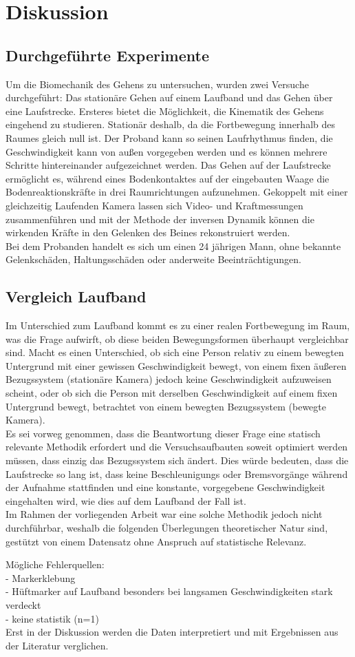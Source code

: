 \section{Diskussion}
\subsection{Durchgeführte Experimente}
Um die Biomechanik des Gehens zu untersuchen, wurden zwei Versuche durchgeführt: Das stationäre Gehen auf einem Laufband und das Gehen über eine Laufstrecke. Ersteres bietet die Möglichkeit, die Kinematik des Gehens eingehend zu studieren. Stationär deshalb, da die Fortbewegung innerhalb des Raumes gleich null ist. Der Proband kann so seinen Laufrhythmus finden, die Geschwindigkeit kann von außen vorgegeben werden und es können mehrere Schritte hintereinander aufgezeichnet werden. Das Gehen auf der Laufstrecke ermöglicht es, während eines Bodenkontaktes auf der eingebauten Waage die Bodenreaktionskräfte in drei Raumrichtungen aufzunehmen. Gekoppelt mit einer gleichzeitig Laufenden Kamera lassen sich Video- und Kraftmessungen zusammenführen und mit der Methode der inversen Dynamik können die wirkenden Kräfte in den Gelenken des Beines rekonstruiert werden. \\
Bei dem Probanden handelt es sich um einen 24 jährigen Mann, ohne bekannte Gelenkschäden, Haltungsschäden oder anderweite Beeinträchtigungen. 




\subsection{Vergleich Laufband}
Im Unterschied zum Laufband kommt es zu einer realen Fortbewegung im Raum, was die Frage aufwirft, ob diese beiden Bewegungsformen überhaupt vergleichbar sind. Macht es einen Unterschied, ob sich eine Person relativ zu einem bewegten Untergrund mit einer gewissen Geschwindigkeit bewegt, von einem fixen äußeren Bezugssystem (stationäre Kamera) jedoch keine Geschwindigkeit aufzuweisen scheint, oder ob sich die Person mit derselben Geschwindigkeit auf einem fixen Untergrund bewegt, betrachtet von einem bewegten Bezugssystem (bewegte Kamera).\\
Es sei vorweg genommen, dass die Beantwortung dieser Frage eine statisch relevante Methodik erfordert und die Versuchsaufbauten soweit optimiert werden müssen, dass einzig das Bezugssystem sich ändert. Dies würde bedeuten, dass die Laufstrecke so lang ist, dass keine Beschleunigungs oder Bremsvorgänge während der Aufnahme stattfinden und eine konstante, vorgegebene Geschwindigkeit eingehalten wird, wie dies auf dem Laufband der Fall ist.\\
Im Rahmen der vorliegenden Arbeit war eine solche Methodik jedoch nicht durchführbar, weshalb die folgenden Überlegungen theoretischer Natur sind, gestützt von einem Datensatz ohne Anspruch auf statistische Relevanz. 









Mögliche Fehlerquellen:\\
- Markerklebung\\
- Hüftmarker auf Laufband besonders bei langsamen Geschwindigkeiten stark verdeckt\\
- keine statistik (n=1)\\

Erst in der Diskussion werden die Daten interpretiert und mit Ergebnissen aus der Literatur verglichen.